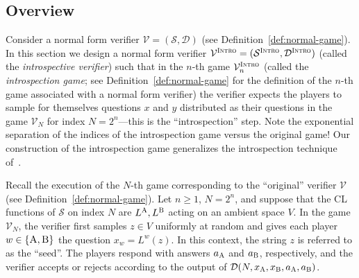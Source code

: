 \documentclass[11pt]{article}
\theoremstyle{definition}
\newcommand{\sampler}{\mathcal{S}}
\newcommand{\decider}{\mathcal{D}}
\newcommand{\verifier}{\mathcal{V}}
\newcommand{\gamestyle}[1]{\ensuremath{\textsc{#1}}\xspace}
\newcommand{\intro}{\gamestyle{Intro}}
\newcommand{\labelstyle}[1]{\ensuremath{\textsc{#1}}\xspace}
\newcommand{\alice}{\labelstyle{A}}
\newcommand{\bob}{\labelstyle{B}}
\newcommand{\typestyle}[1]{\ensuremath{\textsc{#1}}\xspace}
\newcommand{\Intro}{\typestyle{Intro}}
\newcommand{\AB}{\{\alice, \bob\}}
\begin{document}
\newcommand{\La}{[L(\cdot) = y]}
\newcommand{\Lk}[1][k]{[L_{#1,\, y_{<#1}}(\cdot) = y_{#1}]}
\newcommand{\Llk}[1][k]{[L_{<#1}(\cdot) = y_{<#1}]}
\newcommand{\Llek}[1][k]{[L_{\le #1}(\cdot) = y_{\le #1}]}
\newcommand{\Lperpk}[1][k]{[L_{#1,\, y_{<#1}}^\perp (\cdot) = y_{#1}^\perp]}

\newcommand{\aigek}[1][y_{\ge k},\, a]{A^{\Intro,\, y_{<k}}_{#1}}
\newcommand{\aigk}[1][y_{> k},\, a]{A^{\Intro,\, y_{\le k}}_{#1}}
\newcommand{\bsL}{\bs[\La,\, a]}
\newcommand{\zL}{\z[\La]}
\newcommand{\zLk}[1][k]{\sigma^{Z}_{\Lk[#1]}}
\newcommand{\zLlk}[1][k]{\z[{\Llk[#1]}]}
\newcommand{\zLlek}{\z[\Llek]}
\newcommand{\xLperpk}[1][k]{\sigma^{X}_{\Lperpk[#1]}}

\newcommand{\aizk}[1][y,\, a]{A^{\Intro,\, Z_{<k}}_{#1}}

\subsection{Overview}
\label{sec:intro-overview}

Consider a normal form verifier $\verifier = (\sampler, \decider)$ (see
Definition~\ref{def:normal-game}).
In this section we design a normal form verifier $\verifier^\intro =
(\sampler^\intro, \decider^\intro)$ (called the \emph{introspective verifier})
such that in the $n$-th game $\verifier^\intro_n$ (called the
\emph{introspection game}; see Definition~\ref{def:normal-game} for the
definition of the $n$-th game associated with a normal form verifier) the
verifier expects the players to sample for themselves questions $x$ and $y$
distributed as their questions in the game $\verifier_N$ for index $N =
2^n$---this is the ``introspection'' step.
Note the exponential separation of the indices of the introspection game versus
the original game!
Our construction of the introspection game generalizes the introspection
technique of~\cite{NW19}.

Recall the execution of the $N$-th game corresponding to the ``original''
verifier $\verifier$ (see Definition~\ref{def:normal-game}).
Let $n\geq 1$, $N=2^n$, and suppose that the CL functions of $\sampler$ on index
$N$ are $L^\alice,L^\bob$ acting on an ambient space $V$.
In the game $\verifier_N$, the verifier first samples $z \in V$ uniformly at
random and gives each player $w\in\AB$ the question $x_w = L^w(z)$.
In this context, the string $z$ is referred to as the ``seed''.
The players respond with answers $a_\alice$ and $a_\bob$, respectively, and the
verifier accepts or rejects according to the output of $\decider(N, x_\alice,
x_\bob, a_\alice, a_\bob)$.
\end{document}
